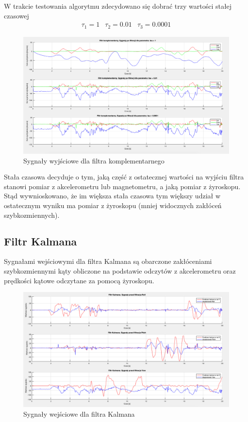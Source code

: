 W trakcie testowania algorytmu zdecydowano się dobrać trzy wartości stałej czasowej
$$
    \begin{array}{ccc}
        \tau_1 = 1 & \tau_2 = 0.01 & \tau_3 = 0.0001
    \end{array}
$$
\begin{figure}[h!]
    \centering
    \includegraphics[width=1\textwidth]{Rysunki/Rozdzial04/Filtr_komplementarny_po.png}
    \caption{Sygnały wyjściowe dla filtra komplementarnego}
    \label{Komplementarny przed}
\end{figure}

Stała czasowa decyduje o tym, jaką część z ostatecznej wartości na wyjściu filtra stanowi pomiar z akcelerometru lub magnetometru, a jaką pomiar z żyroskopu. Stąd wywnioskowano, że im większa stała czasowa tym większy udział w ostatecznym wyniku ma pomiar z żyroskopu (mniej widocznych zakłóceń szybkozmiennych).
\subsection{Filtr Kalmana}

Sygnałami wejściowymi dla filtra Kalmana są obarczone zakłóceniami szybkozmiennymi kąty obliczone na podstawie odczytów z akcelerometru oraz prędkości kątowe odczytane za pomocą żyroskopu.
\begin{figure}[h!]
    \centering
    \includegraphics[width=1\textwidth]{Rysunki/Rozdzial04/Filtr_Kalmana_przed.png}
    \caption{Sygnały wejściowe dla filtra Kalmana}
    \label{Kalman przed}
\end{figure}

